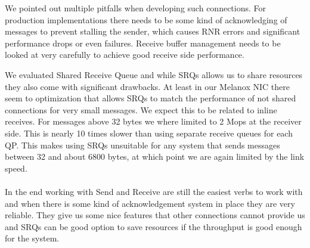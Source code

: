 We pointed out multiple pitfalls when developing such connections. For production implementations there needs
to be some kind of acknowledging of messages to prevent stalling the sender, which causes RNR errors and significant 
performance drops or even failures. Receive buffer management needs to be looked at very carefully to achieve good receive
side performance.

We evaluated Shared Receive Queue and while SRQs allows us to share resources they also come with significant drawbacks. At
least in our Melanox NIC there seem to optimization that allows SRQs to match the performance of not shared connections for
very small messages. We expect this to be related to inline receives. For messages above 32 bytes we where limited to 
2 Mops at the receiver side. This is nearly 10 times slower than using separate receive queues for each QP. This makes 
using SRQs unsuitable for any system that sends messages between 32 and about 6800 bytes, at which point we are again limited 
by the link speed.


\paragraph{} In the end working with Send and Receive are still the easiest verbs to work with and when there is some kind of
acknowledgement system in place they are very reliable. They give us some nice features that other connections cannot provide
us and SRQs can be good option to save resources if the throughput is good enough for the system.


